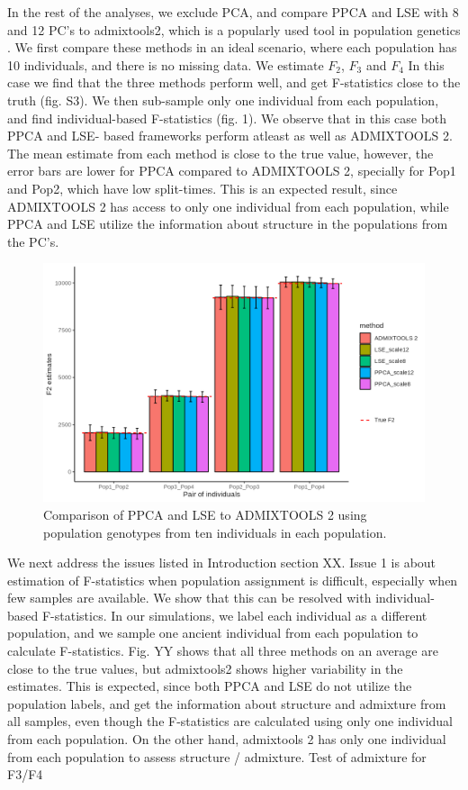 \documentclass[12pt, letterpaper]{article}
\begin{document}
In the rest of the analyses, we exclude PCA, and compare PPCA and LSE with 8 and 12 PC's to admixtools2, which is a popularly used tool in population genetics \cite{maier_limits_2022}. We first compare these methods in an ideal scenario, where each population has 10 individuals, and there is no missing data. We estimate $F_2$, $F_3$ and $F_4$  In this case we find that the three methods perform well, and get F-statistics close to the truth (fig. S3). We then sub-sample only one individual from each population, and find individual-based F-statistics (fig. 1). We observe that in this case both PPCA and LSE- based frameworks perform atleast as well as ADMIXTOOLS 2. The mean estimate from each method is close to the true value, however, the error bars are lower for PPCA compared to ADMIXTOOLS 2, specially for Pop1 and Pop2, which have low split-times. This is an expected result, since ADMIXTOOLS 2 has access to only one individual from each population, while PPCA and LSE utilize the information about structure in the populations from the PC's.       

\begin{figure}[ht!]
    \includegraphics[width=16.5cm]{plots/simfiles/Ne1000/split_times1000/npop10_nind100/plots_8_12/mu0.05_f2_plot_slides_1ind.png}
    \centering
    \caption{Comparison of PPCA and LSE to ADMIXTOOLS 2 using population genotypes from ten individuals in each population.}
    \label{figS2:pc_scale}
\end{figure}

We next address the issues listed in Introduction section XX. Issue 1 is about estimation of F-statistics when population assignment is difficult, especially when few samples are available. We show that this can be resolved with individual-based F-statistics. In our simulations, we label each individual as a different population, and we sample one ancient individual from each population  to calculate F-statistics. Fig. YY shows that all three methods on an average are close to the true values, but admixtools2 shows higher variability in the estimates. This is expected, since both PPCA and LSE do not utilize the population labels, and get the information about structure and admixture from all samples, even though the F-statistics are calculated using only one individual from each population. On the other hand, admixtools 2 has only one individual from each population to assess structure / admixture. 
Test of admixture for F3/F4
\end{document}
